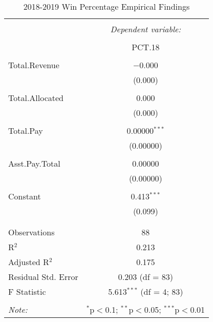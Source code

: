 \documentclass[12pt,english]{article}
\begin{document}
\begin{table}[!htbp] \centering 
\label{Table:Table3}
  \caption{2018-2019 Win Percentage Empirical Findings} 
  \label{} 
\begin{tabular}{@{\extracolsep{5pt}}lc} 
\\[-1.8ex]\hline 
\hline \\[-1.8ex] 
 & \multicolumn{1}{c}{\textit{Dependent variable:}} \\ 
\cline{2-2} 
\\[-1.8ex] & PCT.18 \\ 
\hline \\[-1.8ex] 
 Total.Revenue & $-$0.000 \\ 
  & (0.000) \\ 
  & \\ 
 Total.Allocated & 0.000 \\ 
  & (0.000) \\ 
  & \\ 
 Total.Pay & 0.00000$^{***}$ \\ 
  & (0.00000) \\ 
  & \\ 
 Asst.Pay.Total & 0.00000 \\ 
  & (0.00000) \\ 
  & \\ 
 Constant & 0.413$^{***}$ \\ 
  & (0.099) \\ 
  & \\ 
\hline \\[-1.8ex] 
Observations & 88 \\ 
R$^{2}$ & 0.213 \\ 
Adjusted R$^{2}$ & 0.175 \\ 
Residual Std. Error & 0.203 (df = 83) \\ 
F Statistic & 5.613$^{***}$ (df = 4; 83) \\ 
\hline 
\hline \\[-1.8ex] 
\textit{Note:}  & \multicolumn{1}{r}{$^{*}$p$<$0.1; $^{**}$p$<$0.05; $^{***}$p$<$0.01} \\ 
\end{tabular} 
\end{table} 
\end{document}
